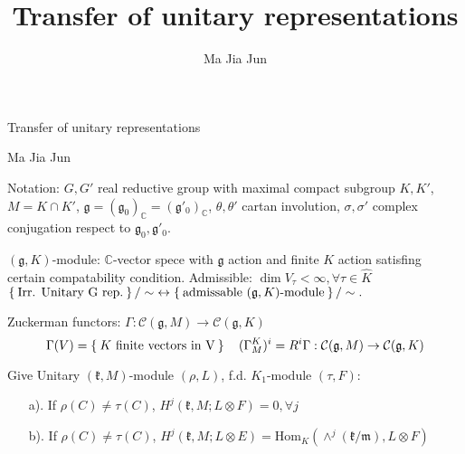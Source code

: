 \documentclass{beamer}
\title{Transfer of unitary representations}
\author{Ma Jia Jun}
\begin{document}
\color{white}

\def\gg{{\mathfrak{g}}}
\def\kk{{\mathfrak{k}}}
\def\pp{{\mathfrak{p}}}
\def\qq{{\mathfrak{q}}}
\def\oo{{\mathfrak{o}}}
\def\mm{{\mathfrak{m}}}
\def\bC{{\mathbb{C}}}
\def\bR{{\mathbb{R}}}
\def\hK{{\widehat{K}}}
\def\cC{{\mathcal{C}}}
\def\Hom{\mathrm{Hom}}
\def\inn#1#2{\left\langle{#1},{#2}\right\rangle}
\def\innc#1#2{\left({#1},{#2}\right)}

\begin{frame}[t]
\begin{center} 
\large Transfer of unitary representations
\end{center}
\begin{center}
 Ma Jia Jun
\end{center}
\end{frame}


\begin{frame}[t]
Notation: $G,G'$ real reductive group with maximal compact subgroup
$K,K'$, $M=K\cap K'$,
$\gg=(\gg_0)_\bC=(\gg'_0)_\bC$, $\theta,\theta'$ cartan involution,
$\sigma,\sigma'$ complex conjugation respect to $\gg_0, \gg'_0$.
\end{frame}

\begin{frame}[t] $(\gg,K)$-module: $\bC$-vector spece with $\gg$ action and finite $K$ action
satisfing certain compatability condition. Admissible:
$\dim V_\tau < \infty, \forall \tau\in \hK$
$
\Set{\text{Irr. Unitary G rep.}}/\sim\; \leftrightarrow 
\Set{\text{admissable } (\gg,K)\text{-module}}/\sim.
$
\end{frame}

\begin{frame}[t]
Zuckerman functors: $\Gamma:\cC(\gg,M)\to \cC(\gg,K)$ 
\[
\Gamma(V) = \Set{K\text{ finite vectors in V}}
\quad
(\Gamma_M^K)^i=R^i\Gamma: \cC(\gg,M)\to \cC(\gg,K)
\]
\end{frame}

\begin{frame}[t]
Give Unitary $(\kk,M)$-module $(\rho,L)$, f.d. $K_1$-module 
$(\tau,F)$:
\begin{itemize}
\item[\color{white} a).] \color{white} If $\rho(C) \neq \tau(C)$, 
$H^j(\kk,M; L\otimes F)=0, \forall j$
\item[\color{white} b).] \color{white} If $\rho(C) \neq \tau(C)$, 
   $H^j(\kk,M; L\otimes E) =\Hom_K(\wedge^j(\kk/\mm),L\otimes F)$
\end{itemize}
\end{frame}
\end{document}
